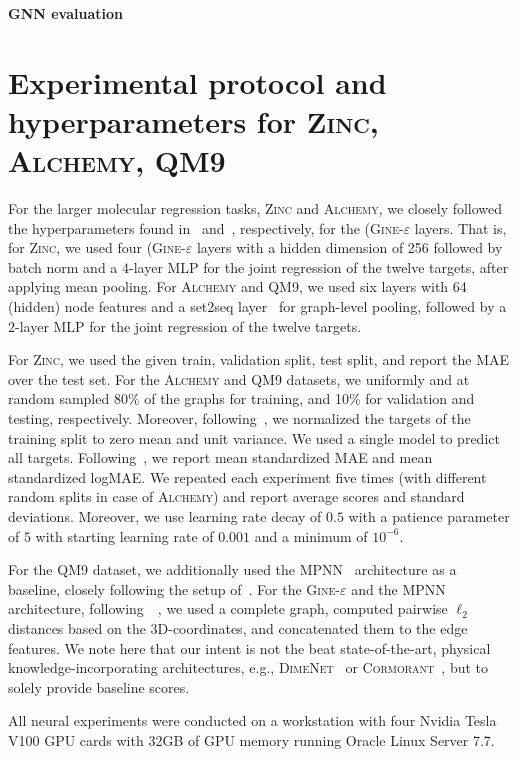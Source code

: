 \documentclass{article}
\newcommand{\xhdr}[1]{{\noindent\bfseries #1}}
\theoremstyle{definition}
\begin{document}
\xhdr{GNN evaluation}


\section{Experimental protocol and hyperparameters for \textsc{Zinc}, \textsc{Alchemy}, \textsc{QM9}}
For the larger molecular regression tasks, \textsc{Zinc} and \textsc{Alchemy}, we closely followed the hyperparameters found in~\cite{Dwi+2020} and~\cite{Che+2020}, respectively, for the (\textsc{Gine-$\varepsilon$} layers. That is, for \textsc{Zinc}, we used four (\textsc{Gine-$\varepsilon$} layers with a hidden dimension of 256 followed by batch norm and a $4$-layer MLP for the joint regression of the twelve targets, after applying mean pooling. For \textsc{Alchemy} and \textsc{QM9}, we used six layers with 64 (hidden) node features and a set2seq layer~\cite{Vin+2016} for graph-level pooling, followed by a $2$-layer MLP for the joint regression of the twelve targets.

For \textsc{Zinc}, we used the given train, validation split, test split, and report the MAE over the test set. For the \textsc{Alchemy} and \textsc{QM9} datasets, we uniformly and at random sampled 80\% of the graphs for training, and 10\% for validation and testing, respectively. Moreover, following~\cite{Che+2020,Gil+2017}, we normalized the targets of the training split to zero mean and unit variance. We used a single model to predict all targets. Following~\cite{Kli+2020}, we report mean standardized MAE and mean standardized logMAE. We repeated each experiment five times (with different random splits in case of \textsc{Alchemy}) and report average scores and standard deviations.  Moreover, we use learning rate decay of $0.5$ with a patience parameter of $5$ with starting learning rate of $0.001$ and a minimum of $10^{-6}$.

For the \textsc{QM9} dataset, we additionally used the \textsc{MPNN}~\cite{Gil+2017} architecture as a baseline, closely following the setup of~\cite{Gil+2017}. For the \textsc{Gine-$\varepsilon$}  and the \textsc{MPNN} architecture, following~\citeauthor{Gil+2017}~\cite{Gil+2017}, we used a complete graph, computed pairwise $\ell_2$ distances based on the 3D-coordinates, and concatenated them to the edge features. We note here that our intent is not the beat state-of-the-art, physical knowledge-incorporating architectures, e.g., \textsc{DimeNet}~\cite{Kli+2020} or \textsc{Cormorant}~\cite{And+2019}, but to solely provide baseline scores. 

All neural experiments were conducted on a workstation with four Nvidia Tesla V100 GPU cards with 32GB of GPU memory running Oracle Linux Server 7.7.
\end{document}
